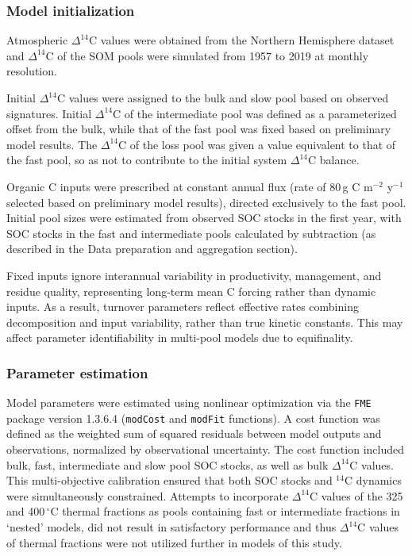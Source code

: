 \documentclass[bg, manuscript]{copernicus}
\begin{document}
\subsubsection{Model initialization}
Atmospheric $\Delta^{14}\text{C}$ values were obtained from the Northern Hemisphere dataset \citep{Hua2022} and $\Delta^{14}\text{C}$ of the SOM pools were simulated from 1957 to 2019 at monthly resolution.

Initial $\Delta^{14}\text{C}$ values were assigned to the bulk and slow pool based on observed signatures. Initial $\Delta^{14}\text{C}$ of the intermediate pool was defined as a parameterized offset from the bulk, while that of the fast pool was fixed based on preliminary model results. The $\Delta^{14}\text{C}$ of the loss pool was given a value equivalent to that of the fast pool, so as not to contribute to the initial system $\Delta^{14}\text{C}$ balance.

Organic C inputs were prescribed at constant annual flux (rate of 80\,g C m$^{-2}$ y$^{-1}$ selected based on preliminary model results), directed exclusively to the fast pool. Initial pool sizes were estimated from observed SOC stocks in the first year, with SOC stocks in the fast and intermediate pools calculated by subtraction (as described in the Data preparation and aggregation section).

Fixed inputs ignore interannual variability in productivity, management, and residue quality, representing long-term mean C forcing rather than dynamic inputs. As a result, turnover parameters reflect effective rates combining decomposition and input variability, rather than true kinetic constants. This may affect parameter identifiability in multi-pool models due to equifinality.

\subsubsection{Parameter estimation}
Model parameters were estimated using nonlinear optimization via the \texttt{FME} package version 1.3.6.4 (\texttt{modCost} and \texttt{modFit} functions). A cost function was defined as the weighted sum of squared residuals between model outputs and observations, normalized by observational uncertainty. The cost function included bulk, fast, intermediate and slow pool SOC stocks, as well as bulk $\Delta^{14}\text{C}$ values. This multi-objective calibration ensured that both SOC stocks and $^{14}\text{C}$ dynamics were simultaneously constrained. Attempts to incorporate $\Delta^{14}\text{C}$ values of the 325 and 400\,$^\circ\text{C}$ thermal fractions as pools containing fast or intermediate fractions in ‘nested’ models, did not result in satisfactory performance and thus $\Delta^{14}\text{C}$ values of thermal fractions were not utilized further in models of this study.
\end{document}
